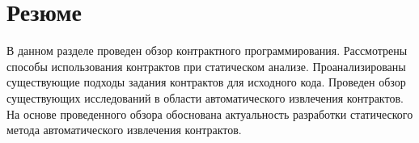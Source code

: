 \section{Резюме}
В данном разделе проведен обзор контрактного программирования. Рассмотрены способы использования контрактов при статическом анализе. Проанализированы существующие подходы задания контрактов для исходного кода. Проведен обзор существующих исследований в области автоматического извлечения контрактов. На основе проведенного обзора обоснована актуальность разработки статического метода автоматического извлечения контрактов.